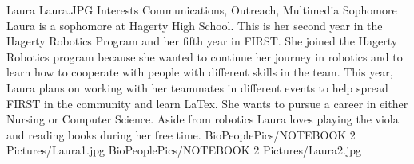 \insertbio
{Laura}
{Laura.JPG}
{Interests}
{Communications, Outreach, Multimedia}
{Sophomore}
{
Laura is a sophomore at Hagerty High School. This is her second year in the Hagerty Robotics Program and her fifth year in FIRST. She joined the Hagerty Robotics program because she wanted to continue her journey in robotics and to learn how to cooperate with people with different skills in the team. This year, Laura plans on working with her teammates in different events to help spread FIRST in the community and learn LaTex. She wants to pursue a career in either Nursing or Computer Science. Aside from robotics Laura loves playing the viola and reading books during her free time.
}
{BioPeoplePics/NOTEBOOK 2 Pictures/Laura1.jpg}
{BioPeoplePics/NOTEBOOK 2 Pictures/Laura2.jpg}